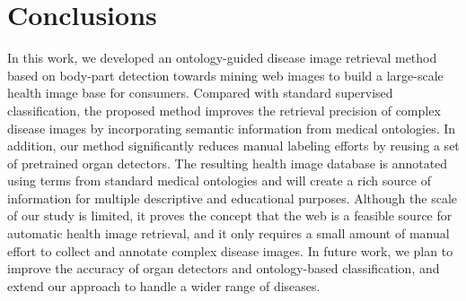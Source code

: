 \section{Conclusions}
In this work, we developed an ontology-guided disease image
retrieval method based on body-part detection towards mining
web images to build a large-scale health image base for consumers.
Compared with standard supervised classification, the
proposed method improves the retrieval precision of complex
disease images by incorporating semantic information from
medical ontologies. In addition, our method significantly
reduces manual labeling efforts by reusing a set of pretrained
organ detectors. The resulting health image database is annotated
using terms from standard medical ontologies and will
create a rich source of information for multiple descriptive and
educational purposes. Although the scale of our study is limited,
it proves the concept that the web is a feasible source for
automatic health image retrieval, and it only requires a small
amount of manual effort to collect and annotate complex
disease images. In future work, we plan to improve the accuracy
of organ detectors and ontology-based classification, and extend
our approach to handle a wider range of diseases. 